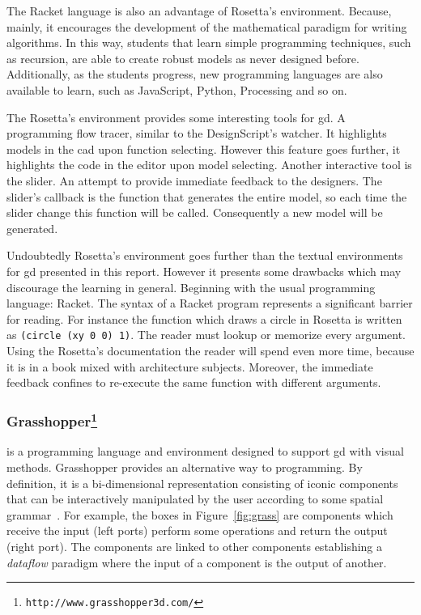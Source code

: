 The Racket language is also an advantage of Rosetta's environment. Because, mainly, it encourages the development of the mathematical paradigm for writing algorithms. In this way, students that learn simple programming techniques, such as recursion, are able to create robust models as never designed before. Additionally, as the students progress, new programming languages are also available to learn, such as JavaScript, Python, Processing and so on.

The Rosetta's environment provides some interesting tools for \ac{gd}. A programming flow tracer, similar to the DesignScript's watcher. It highlights models in the \ac{cad} upon function selecting. However this feature goes further, it highlights the code in the editor upon model selecting. Another interactive tool is the slider. An attempt to provide immediate feedback to the designers. The slider's callback is the function that generates the entire model, so each time the slider change this function will be called. Consequently a new model will be generated.

Undoubtedly Rosetta's environment goes further than the textual environments for \ac{gd} presented in this report. However it presents some drawbacks which may discourage the learning in general. Beginning with the usual programming language: Racket. The syntax of a Racket program represents a significant barrier for reading. For instance the function which draws a circle in Rosetta is written as \texttt{(circle (xy 0 0) 1)}. The reader must lookup or memorize every argument. Using the Rosetta's documentation the reader will spend even more time, because it is in a book mixed with architecture subjects. Moreover, the immediate feedback confines to re-execute the same function with different arguments.
\subsubsection{Grasshopper\protect\footnote{\texttt{http://www.grasshopper3d.com/}}} is a programming language and environment designed to support \ac{gd} with visual methods. Grasshopper provides an alternative way to programming. By definition, it is a bi-dimensional representation consisting of iconic components that can be interactively manipulated by the user according to some spatial grammar~\cite{myers1990taxonomies}. For example, the boxes in Figure~\ref{fig:grass} are components which receive the input (left ports) perform some operations and return the output (right port). The components are linked to other components establishing a \textit{dataflow} paradigm where the input of a component is the output of another.

